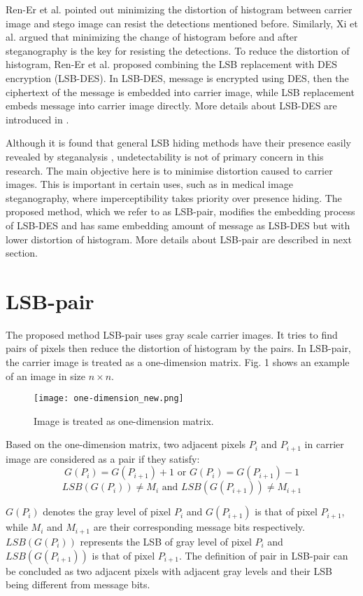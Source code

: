 \documentclass[a4paper,10pt,twocolumn]{article}
\begin{document}
Ren-Er et al. \cite{c3} pointed out minimizing the distortion of histogram between
carrier image and stego image can resist the detections mentioned before.
Similarly, Xi et al. \cite{c1} argued that minimizing the change of histogram before
and after steganography is the key for resisting the detections. To reduce the
distortion of histogram, Ren-Er et al. \cite{c3} proposed combining the LSB
replacement with DES encryption (LSB-DES). In LSB-DES, message is
encrypted using DES, then the ciphertext of the message is embedded into
carrier image, while LSB replacement embeds message into carrier image
directly. More details about LSB-DES are introduced in \cite{c3}.

Although it is found that general LSB hiding methods have their presence easily revealed
by steganalysis \cite{7}, undetectability is not of primary concern in this research.
The main objective here is to minimise distortion caused to carrier images.
This is important in certain uses, such as in medical image steganography, where
imperceptibility takes priority over presence hiding.
The proposed method, which we refer to as LSB-pair, modifies the embedding process 
of LSB-DES and has same embedding amount of message as LSB-DES but with lower distortion of
histogram. More details about LSB-pair are described in next section.


\section{LSB-pair}

The proposed method LSB-pair uses gray scale carrier images. It tries to find
pairs of pixels then reduce the distortion of histogram by the pairs. In LSB-pair,
the carrier image is treated as a one-dimension matrix. Fig. 1 shows an
example of an image in size $n \times n$.

\begin{figure}
\texttt{[image: one-dimension\_new.png]}
\caption{Image is treated as one-dimension matrix.}
\end{figure}


Based on the one-dimension matrix, two adjacent pixels $P_i$ and $P_{i+1}$ 
in carrier image are considered as a pair if they satisfy:
$$ G(P_i) = G(P_{i+1}) + 1 \text{ or } G(P_i) = G(P_{i+1}) - 1 $$
$$ LSB(G(P_i)) \neq M_i \text{ and } LSB(G(P_{i+1})) \neq M_{i+1} $$

$G(P_i)$ denotes the gray level of pixel $P_i$ and $G(P_{i+1})$ is that of pixel $P_{i+1}$,
while $M_i$ and $M_{i+1}$ are their corresponding message bits respectively.
$LSB(G(P_i))$ represents the LSB of gray level of pixel $P_i$ and $LSB(G(P_{i+1}))$ 
is that of pixel $P_{i+1}$. The definition of pair in LSB-pair can be concluded as two
adjacent pixels with adjacent gray levels and their LSB being different from message bits.
\end{document}
